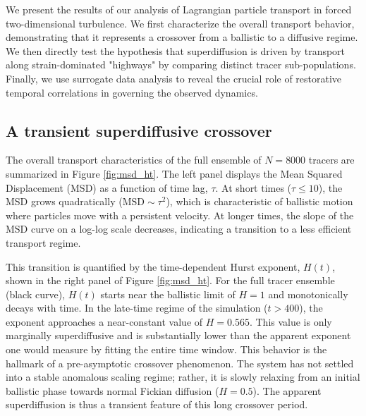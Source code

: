 \documentclass[]{article}
\begin{document}
We present the results of our analysis of Lagrangian particle transport in forced two-dimensional turbulence. We first characterize the overall transport behavior, demonstrating that it represents a crossover from a ballistic to a diffusive regime. We then directly test the hypothesis that superdiffusion is driven by transport along strain-dominated "highways" by comparing distinct tracer sub-populations. Finally, we use surrogate data analysis to reveal the crucial role of restorative temporal correlations in governing the observed dynamics.

\subsection{A transient superdiffusive crossover}

The overall transport characteristics of the full ensemble of $N=8000$ tracers are summarized in Figure \ref{fig:msd_ht}. The left panel displays the Mean Squared Displacement (MSD) as a function of time lag, $\tau$. At short times ($\tau \leq 10$), the MSD grows quadratically ($\mathrm{MSD} \sim \tau^2$), which is characteristic of ballistic motion where particles move with a persistent velocity. At longer times, the slope of the MSD curve on a log-log scale decreases, indicating a transition to a less efficient transport regime.

This transition is quantified by the time-dependent Hurst exponent, $H(t)$, shown in the right panel of Figure \ref{fig:msd_ht}. For the full tracer ensemble (black curve), $H(t)$ starts near the ballistic limit of $H=1$ and monotonically decays with time. In the late-time regime of the simulation ($t > 400$), the exponent approaches a near-constant value of $H = 0.565$. This value is only marginally superdiffusive and is substantially lower than the apparent exponent one would measure by fitting the entire time window. This behavior is the hallmark of a pre-asymptotic crossover phenomenon. The system has not settled into a stable anomalous scaling regime; rather, it is slowly relaxing from an initial ballistic phase towards normal Fickian diffusion ($H=0.5$). The apparent superdiffusion is thus a transient feature of this long crossover period.
\end{document}
